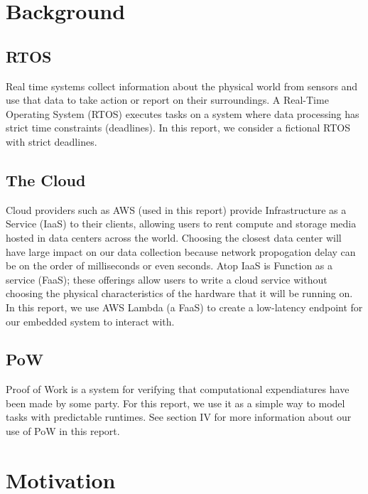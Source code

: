 \documentclass[twoside,twocolumn]{article}
\newcommand{\newp}{\newline\indent}
\begin{document}

\section{Background}

\subsection{RTOS}

Real time systems collect information about the physical world from sensors and use that data to take action or report on their surroundings.
A Real-Time Operating System (RTOS) executes tasks on a system where data processing has strict time constraints (deadlines).
\newp In this report, we consider a fictional RTOS with strict deadlines.

\subsection{The Cloud}

Cloud providers such as AWS (used in this report) provide Infrastructure as a Service (IaaS) to their clients, allowing users to rent compute and storage media hosted in data centers across the world.
Choosing the closest data center will have large impact on our data collection because network propogation delay can be on the order of milliseconds or even seconds.
\newp Atop IaaS is Function as a service (FaaS); these offerings allow users to write a cloud service without choosing the physical characteristics of the hardware that it will be running on.
In this report, we use AWS Lambda (a FaaS) to create a low-latency endpoint for our embedded system to interact with.

\subsection{PoW}

Proof of Work is a system for verifying that computational expendiatures have been made by some party.
For this report, we use it as a simple way to model tasks with predictable runtimes.
\newp See section IV for more information about our use of PoW in this report.


\section{Motivation}
\end{document}
